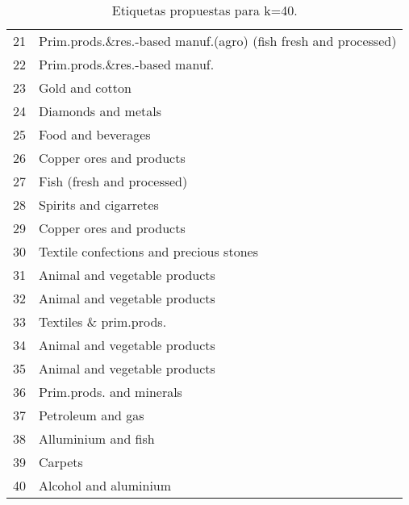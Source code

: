 \documentclass[class=article, crop=false]{standalone}
\begin{document}
\begin{table}[]
\begin{tabular}{ll}
		21         & Prim.prods.\&res.-based manuf.(agro) (fish fresh and processed) \\
		22         & Prim.prods.\&res.-based manuf.                                  \\
		23         & Gold and cotton                                                 \\
		24         & Diamonds and metals                                             \\
		25         & Food and beverages                                              \\
		26         & Copper ores and products                                        \\
		27         & Fish (fresh and processed)                                      \\
		28         & Spirits and cigarretes                                          \\
		29         & Copper ores and products                                        \\
		30         & Textile confections and precious stones                         \\
		31         & Animal and vegetable products                                   \\
		32         & Animal and vegetable products                                   \\
		33         & Textiles \& prim.prods.                                         \\
		34         & Animal and vegetable products                                   \\
		35         & Animal and vegetable products                                   \\
		36         & Prim.prods. and minerals                                        \\
		37         & Petroleum and gas                                               \\
		38         & Alluminium and fish                                             \\
		39         & Carpets                                                         \\
		40         & Alcohol and aluminium                                          
	\end{tabular}
	\label{Table: etiquetas}
	\caption{Etiquetas propuestas para k=40.}
\end{table}
\end{document}
